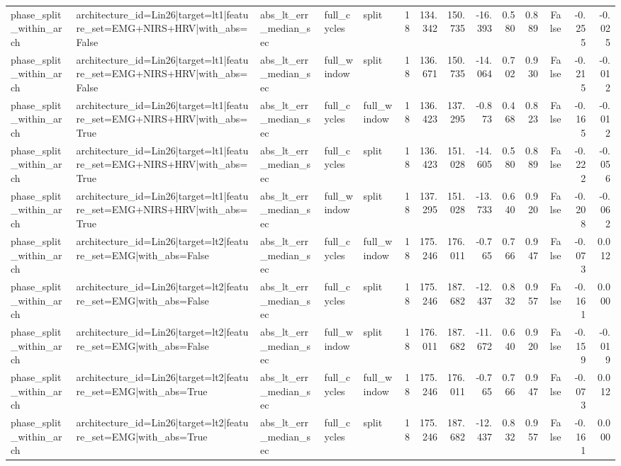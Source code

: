 \begin{table}
\begin{tabular}{lllllrrrrrrrrr}
phase_split_within_arch & architecture_id=Lin26|target=lt1|feature_set=EMG+NIRS+HRV|with_abs=False & abs_lt_err_median_sec & full_cycles & split & 18 & 134.342 & 150.735 & -16.393 & 0.580 & 0.889 & False & -0.255 & -0.025 \\
phase_split_within_arch & architecture_id=Lin26|target=lt1|feature_set=EMG+NIRS+HRV|with_abs=False & abs_lt_err_median_sec & full_window & split & 18 & 136.671 & 150.735 & -14.064 & 0.702 & 0.930 & False & -0.215 & -0.012 \\
phase_split_within_arch & architecture_id=Lin26|target=lt1|feature_set=EMG+NIRS+HRV|with_abs=True & abs_lt_err_median_sec & full_cycles & full_window & 18 & 136.423 & 137.295 & -0.873 & 0.468 & 0.823 & False & -0.165 & -0.012 \\
phase_split_within_arch & architecture_id=Lin26|target=lt1|feature_set=EMG+NIRS+HRV|with_abs=True & abs_lt_err_median_sec & full_cycles & split & 18 & 136.423 & 151.028 & -14.605 & 0.580 & 0.889 & False & -0.222 & -0.056 \\
phase_split_within_arch & architecture_id=Lin26|target=lt1|feature_set=EMG+NIRS+HRV|with_abs=True & abs_lt_err_median_sec & full_window & split & 18 & 137.295 & 151.028 & -13.733 & 0.640 & 0.920 & False & -0.208 & -0.062 \\
phase_split_within_arch & architecture_id=Lin26|target=lt2|feature_set=EMG|with_abs=False & abs_lt_err_median_sec & full_cycles & full_window & 18 & 175.246 & 176.011 & -0.765 & 0.766 & 0.947 & False & -0.073 & 0.012 \\
phase_split_within_arch & architecture_id=Lin26|target=lt2|feature_set=EMG|with_abs=False & abs_lt_err_median_sec & full_cycles & split & 18 & 175.246 & 187.682 & -12.437 & 0.832 & 0.957 & False & -0.161 & 0.000 \\
phase_split_within_arch & architecture_id=Lin26|target=lt2|feature_set=EMG|with_abs=False & abs_lt_err_median_sec & full_window & split & 18 & 176.011 & 187.682 & -11.672 & 0.640 & 0.920 & False & -0.159 & -0.019 \\
phase_split_within_arch & architecture_id=Lin26|target=lt2|feature_set=EMG|with_abs=True & abs_lt_err_median_sec & full_cycles & full_window & 18 & 175.246 & 176.011 & -0.765 & 0.766 & 0.947 & False & -0.073 & 0.012 \\
phase_split_within_arch & architecture_id=Lin26|target=lt2|feature_set=EMG|with_abs=True & abs_lt_err_median_sec & full_cycles & split & 18 & 175.246 & 187.682 & -12.437 & 0.832 & 0.957 & False & -0.161 & 0.000 \\

\end{tabular}
\end{table}
